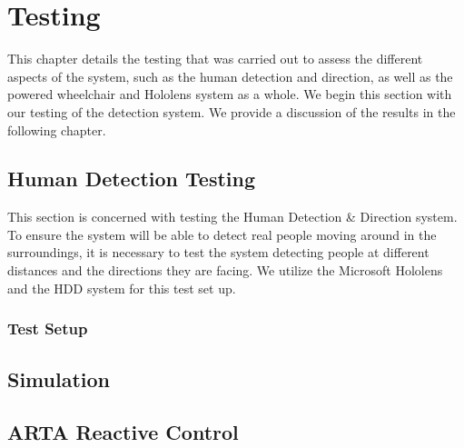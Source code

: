 \chapter{Testing}
This chapter details the testing that was carried out to assess the different aspects of the system, such as the human detection and direction, as well as the powered wheelchair and Hololens system as a whole. We begin this section with our testing of the detection system. We provide a discussion of the results in the following chapter.

\section{Human Detection Testing}
This section is concerned with testing the Human Detection \& Direction system. To ensure the system will be able to detect real people moving around in the surroundings, it is necessary to test the system detecting people at different distances and the directions they are facing. We utilize the Microsoft Hololens and the HDD system for this test set up.

\subsection{Test Setup}
 
\section{Simulation}

\section{ARTA Reactive Control}